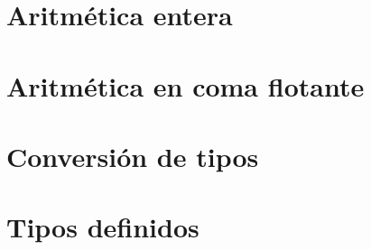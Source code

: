 \documentclass[12pt]{article}
\begin{document}
\section{Aritmética entera}

\section{Aritmética en coma flotante}

\section{Conversión de tipos}

\section{Tipos definidos}




 
\end{document}
